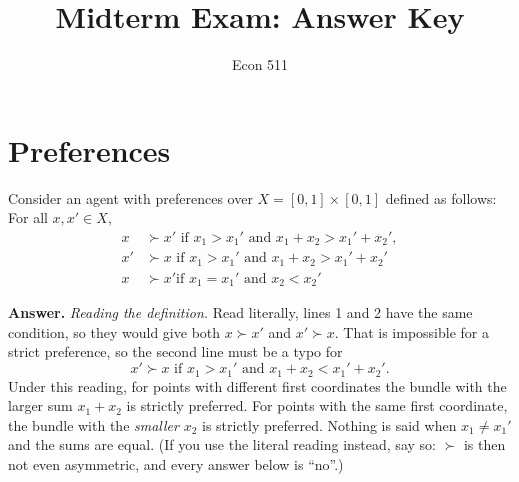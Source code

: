 \documentclass[11pt]{article}
\title{Midterm Exam: Answer Key}
\author{Econ 511}
\date{}
\newenvironment{solution}{\par\smallskip\noindent\textbf{Answer.} }{\par\medskip}
\begin{document}
\maketitle
\thispagestyle{myheadings}

\section{Preferences}

\noindent Consider an agent with preferences over $X=[0,1]\times[0,1]$ defined as follows: For all $x,x'\in X$,
\begin{align*}
x &\succ x' \text{ if } x_1 > x_1' \text{ and } x_1+x_2 > x_1'+x_2',\\
x' &\succ x \text{ if } x_1 > x_1' \text{ and } x_1+x_2 > x_1'+x_2'\\
x &\succ x' \text{if } x_1 = x_1' \text{ and } x_2 < x_2'
\end{align*}

\begin{solution}
\emph{Reading the definition.} Read literally, lines 1 and 2 have the same condition, so they would give both $x\succ x'$ and $x'\succ x$. That is impossible for a strict preference, so the second line must be a typo for
\[
x'\succ x \text{ if } x_1>x_1' \text{ and } x_1+x_2 < x_1'+x_2'.
\]
Under this reading, for points with different first coordinates the bundle with the larger sum $x_1+x_2$ is strictly preferred. For points with the same first coordinate, the bundle with the \emph{smaller} $x_2$ is strictly preferred. Nothing is said when $x_1\neq x_1'$ and the sums are equal. (If you use the literal reading instead, say so: $\succ$ is then not even asymmetric, and every answer below is ``no''.)
\end{solution}
\end{document}
